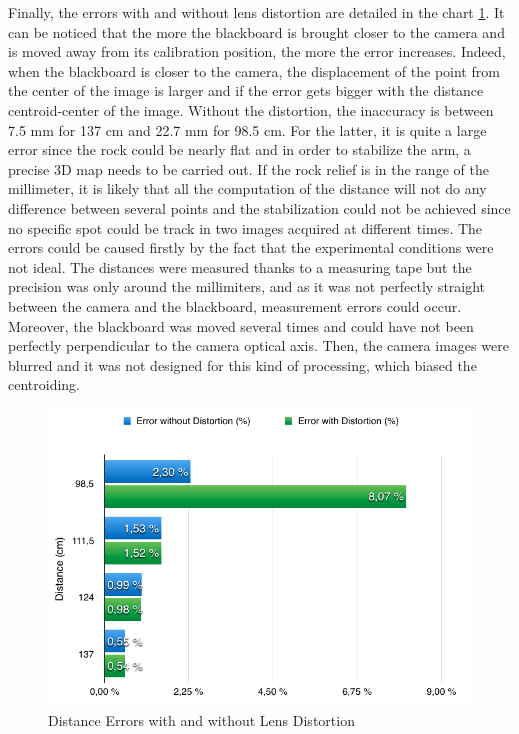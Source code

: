 Finally, the errors with and without lens distortion are detailed in the chart \ref{chart1Point}. It can be noticed that the more the blackboard is brought closer to the camera and is moved away from its calibration position, the more the error increases. Indeed, when the blackboard is closer to the camera, the displacement of the point from the center of the image is larger and if the error gets bigger with the distance centroid-center of the image. Without the distortion, the inaccuracy is between 7.5 mm for 137 cm and 22.7 mm for 98.5 cm. For the latter, it is quite a large error since the rock could be nearly flat and in order to stabilize the arm, a precise 3D map needs to be carried out. If the rock relief is in the range of the millimeter, it is likely that all the computation of the distance will not do any difference between several points and the stabilization could not be achieved since no specific spot could be track in two images acquired at different times. The errors could be caused firstly by the fact that the experimental conditions were not ideal. The distances were measured thanks to a measuring tape but the precision was only around the millimiters, and as it was not perfectly straight between the camera and the blackboard, measurement errors could occur. Moreover, the blackboard was moved several times and could have not been perfectly perpendicular to the camera optical axis. Then, the camera images were blurred and it was not designed for this kind of processing, which biased the centroiding.

\begin{figure}[!h] 
\centering
  \includegraphics[scale=0.5]{fig/chart1Point.png}
\caption{Distance Errors with and without Lens Distortion} 
\label{chart1Point}
\end{figure}

